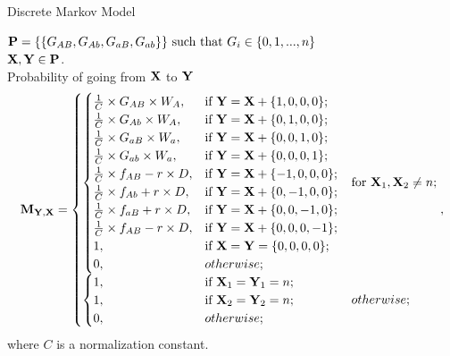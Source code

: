 \documentclass{beamer}
\begin{document}
\begin{frame}{Discrete Markov Model}
\footnotesize

$\bold{P} = \{\{G_{AB},G_{Ab},G_{aB},G_{ab}\}\} \text{ such that } G_i\in\{0,1,...,n\}$\\ 
$\bold{X},\bold{Y} \in \bold{P}$. \\

Probability of going from $\bold{X}$ to $\bold{Y}$
\begin{equation*}
\bold{M}_{\bold{Y},\bold{X}}=
\begin{aligned}
\begin{cases}
\begin{cases}
    \frac{1}{C}\times G_{AB}\times W_A, & \text{if } \bold{Y} = \bold{X} + \{1,0,0,0\}; \\
    \frac{1}{C}\times G_{Ab}\times W_A, & \text{if } \bold{Y} = \bold{X} + \{0,1,0,0\};  \\
    \frac{1}{C}\times G_{aB}\times W_a, & \text{if } \bold{Y} = \bold{X} + \{0,0,1,0\}; \\
    \frac{1}{C}\times G_{ab}\times W_a, & \text{if } \bold{Y} = \bold{X} + \{0,0,0,1\}; \\
    \frac{1}{C}\times f_{AB}-r\times D, & \text{if } \bold{Y} = \bold{X} + \{-1,0,0,0\}; \\
    \frac{1}{C}\times f_{Ab}+r\times D, & \text{if } \bold{Y} = \bold{X} + \{0,-1,0,0\};  \\
    \frac{1}{C}\times f_{aB}+r\times D, & \text{if } \bold{Y} = \bold{X} + \{0,0,-1,0\}; \\
    \frac{1}{C}\times f_{AB}-r\times D, & \text{if } \bold{Y} = \bold{X} + \{0,0,0,-1\}; \\
    1, & \text{if}\ \bold{X} = \bold{Y} = \{0,0,0,0\}; \\
    0, & otherwise;
\end{cases}  & \text{for}\ \bold{X}_1, \bold{X}_2 \neq n; \\
\begin{cases} 
    1, & \text{if}\ \bold{X}_1 = \bold{Y}_1 = n; \\
    1, & \text{if}\ \bold{X}_2 = \bold{Y}_2 = n;  \\
    \mathrlap{0,}\hphantom{\frac{1}{C}\times f_{AB}-r\times D,} & otherwise;
\end{cases} & otherwise;
\end{cases},
\end{aligned}
\end{equation*}
where $C$ is a normalization constant.
\normalsize

\end{frame}
\end{document}
